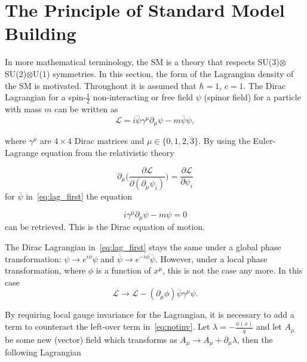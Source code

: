 \section{The Principle of Standard Model Building}
\label{build}
In more mathematical terminology, the \gls{SM} is a theory that respects SU(3)$\otimes$SU(2)$\otimes$U(1) symmetries. In this section, the form of the Lagrangian density of the \gls{SM} is motivated. Throughout \DIFaddbegin {}\DIFaddend it is assumed that $\hbar=1$, $c=1$. The Dirac Lagrangian for a spin-$\frac{1}{2}$ non-interacting or free field $\psi$ (spinor field) for a particle with mass $m$ can be written as 
\begin{equation}
\mathcal{L} = i\overline{\psi}\gamma^{\mu}\partial_{\mu}\psi - m\overline{\psi}\psi,
\label{eq:lag_first}
\end{equation}

\noindent where $\gamma^{\mu}$ are $4\times 4$ Dirac matrices and $\mu\in\{0,1,2,3\}$. By using the Euler-Lagrange equation from the relativistic theory

\begin{equation}
	\partial_{\mu}\Big(\frac{\partial{\mathcal{L}}}{\partial(\partial_{\mu}\psi_{i})} \Big) =\frac{\partial \mathcal{L}}{\partial\psi_{i}}
\label{eq:lag_first}
\end{equation}
for $\overline\psi$ in~\autoref{eq:lag_first} the equation 

\begin{equation}
 i\gamma^{\mu}\partial_{\mu}\psi - m\psi = 0
\label{eq:lag_first2}
\end{equation}
can be retrieved. This is the Dirac equation of motion.

The Dirac Lagrangian in~\autoref{eq:lag_first} stays the same under a global phase transformation: $\psi \rightarrow e^{i\phi}\psi$ and $\overline\psi \rightarrow e^{-i\phi}\overline\psi$. However, under a local phase transformation, where $\phi$ is a function of $x^{\mu}$, this is not the case any more. In this case
\begin{equation}
\mathcal{L} \rightarrow \mathcal{L}- (\partial_{\mu}\phi) \overline{\psi}\gamma^{\mu}\psi.
\label{eq:notinv}
\end{equation}

By requiring local gauge invariance for the Lagrangian, it is necessary to add a term to counteract the left-over term in~\autoref{eq:notinv}. Let $\lambda=-\frac{\phi(x)}{q}$ and let $A_{\mu}$ be some new (vector) field which transforms as $A_{\mu} \rightarrow A_{\mu} + \partial_{\mu}\lambda$, then the following Lagrangian

